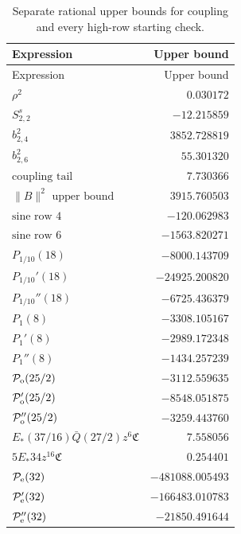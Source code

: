 {\small
\setlength{\tabcolsep}{3pt}
\begin{longtable}{lr}
\caption{Separate rational upper bounds for coupling and every high-row starting check.}\label{tab:scalar-complete}\\
\toprule Expression & Upper bound\\ \midrule
\endfirsthead
\toprule Expression & Upper bound\\ \midrule
\endhead
\bottomrule\endfoot
$\rho^2$ & $0.030172$\\
$S^s_{2,2}$ & $-12.215859$\\
$b_{2,4}^2$ & $3852.728819$\\
$b_{2,6}^2$ & $55.301320$\\
$\text{coupling tail}$ & $7.730366$\\
$\|B\|^2\text{ upper bound}$ & $3915.760503$\\
$\text{sine row }4$ & $-120.062983$\\
$\text{sine row }6$ & $-1563.820271$\\
$P_{1/10}(18)$ & $-8000.143709$\\
$P_{1/10}'(18)$ & $-24925.200820$\\
$P_{1/10}''(18)$ & $-6725.436379$\\
$P_1(8)$ & $-3308.105167$\\
$P_1'(8)$ & $-2989.172348$\\
$P_1''(8)$ & $-1434.257239$\\
$\mathcal P_{\rm o}(25/2)$ & $-3112.559635$\\
$\mathcal P_{\rm o}'(25/2)$ & $-8548.051875$\\
$\mathcal P_{\rm o}''(25/2)$ & $-3259.443760$\\
$E_*(37/16)\bar Q(27/2)z^6\mathfrak C$ & $7.558056$\\
$5E_*34z^{16}\mathfrak C$ & $0.254401$\\
$\mathcal P_{\rm e}(32)$ & $-481088.005493$\\
$\mathcal P_{\rm e}'(32)$ & $-166483.010783$\\
$\mathcal P_{\rm e}''(32)$ & $-21850.491644$\\
\end{longtable}
}


